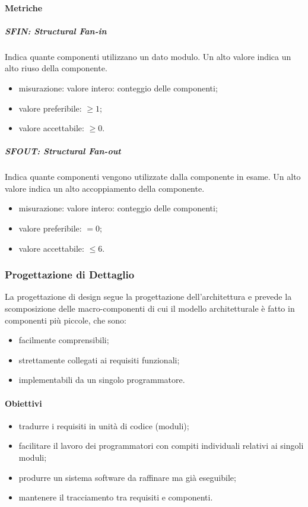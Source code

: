 	\paragraph{Metriche}
	\subparagraph{SFIN: Structural Fan-in}
	Indica quante componenti utilizzano un dato modulo. Un alto valore indica un alto riuso della componente.
	\begin{itemize}
		\item misurazione: valore intero: conteggio delle componenti;
		\item valore preferibile: $ \geq 1$;
		\item valore accettabile: $ \geq 0$.
	\end{itemize}
	\subparagraph{SFOUT: Structural Fan-out}
	Indica quante componenti vengono utilizzate dalla componente in esame. Un alto valore indica un alto
	accoppiamento della componente.
	\begin{itemize}
		\item misurazione: valore intero: conteggio delle componenti;
		\item valore preferibile: $ = 0$;
		\item valore accettabile: $ \leq 6$.
	\end{itemize}
	
			
	\subsubsection{Progettazione di Dettaglio}
	La progettazione di design segue la progettazione dell'architettura e prevede la scomposizione delle macro-componenti di cui il modello architetturale è fatto in componenti più piccole, che sono:
	\begin{itemize}
		\item facilmente comprensibili;
		\item strettamente collegati ai requisiti funzionali;
		\item implementabili da un singolo programmatore.
	\end{itemize}
		\paragraph{Obiettivi}
		\begin{itemize}
			\item tradurre i requisiti in unità di codice (moduli);
			\item facilitare il lavoro dei programmatori con compiti individuali relativi ai singoli moduli;
			\item produrre un sistema software da raffinare ma già eseguibile;
			\item mantenere il tracciamento tra requisiti e componenti.
		\end{itemize}
